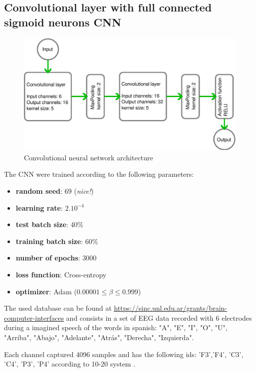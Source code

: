 	\subsection{Convolutional layer with full connected sigmoid neurons CNN}

	\begin{figure}[H]
		\centering
		\includegraphics[width=.7\linewidth]{images/architectureCNN}
		\caption{Convolutional neural network architecture}
		\label{fig:architecturecnn}
	\end{figure}

	\begin{multicols}{2}
		\par The CNN were trained according to the following parameters:
		\begin{itemize}
			\item \textbf{random seed}: 69 (\textit{nice!})
			\item \textbf{learning rate}: $2.10^{-4}$
			\item \textbf{test batch size}: 40\%
			\item \textbf{training batch size}: 60\%
			\item \textbf{number of epochs}: 3000
			\item \textbf{loss function}: Cross-entropy
			\item \textbf{optimizer}: Adam ($0.00001 \leq \beta \leq 0.999$)
		\end{itemize}
	\columnbreak	
		
	\end{multicols}


	\par The used  database \cite{PRG16} can be found at \href{https://sinc.unl.edu.ar/grants/brain-computer-interfaces/}{https://sinc.unl.edu.ar/grants/brain-computer-interfaces} and consists in a set of EEG data recorded with 6 electrodes during a imagined speech of the words in spanish: 
	"A", "E", "I", "O", "U", "Arriba", "Abajo", "Adelante", "Atrás", "Derecha", "Izquierda".\newline
		
	\par Each channel captured 4096 samples and has the following ids: 'F3','F4', 'C3', 'C4', 'P3', 'P4' according to 10-20 system \cite{ScienceOpenVid:5960cfa8-7fde-441c-8592-35fdb9841499}.
